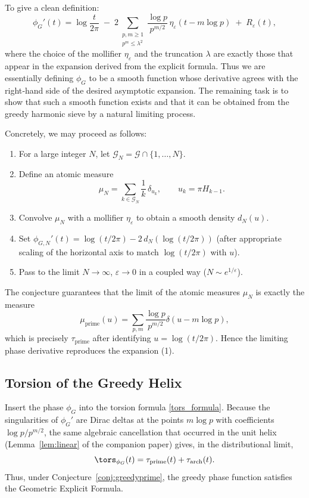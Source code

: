 To give a clean definition:
\[
\phi_G'(t) = \log\frac{t}{2\pi} \;-\; 2\sum_{\substack{p,m\ge1\\ p^m\le\lambda^2}} \frac{\log p}{p^{m/2}} \, \eta_\varepsilon(t - m\log p) \;+\; R_\varepsilon(t),
\]
where the choice of the mollifier \(\eta_\varepsilon\) and the truncation \(\lambda\) are exactly those that appear in the expansion derived from the explicit formula.  Thus we are essentially defining \(\phi_G\) to be a smooth function whose derivative agrees with the right‑hand side of the desired asymptotic expansion.  The remaining task is to show that such a smooth function exists and that it can be obtained from the greedy harmonic sieve by a natural limiting process.

Concretely, we may proceed as follows:
\begin{enumerate}
\item For a large integer \(N\), let \(\mathcal{G}_N = \mathcal{G}\cap\{1,\dots,N\}\).
\item Define an atomic measure
\[
\mu_N = \sum_{k\in\mathcal{G}_N} \frac{1}{k} \, \delta_{u_k}, \qquad u_k = \pi H_{k-1}.
\]
\item Convolve \(\mu_N\) with a mollifier \(\eta_\varepsilon\) to obtain a smooth density \(d_N(u)\).
\item Set \(\phi_{G,N}'(t) = \log(t/2\pi) - 2\,d_N(\log(t/2\pi))\) (after appropriate scaling of the horizontal axis to match \(\log(t/2\pi)\) with \(u\)).
\item Pass to the limit \(N\to\infty\), \(\varepsilon\to0\) in a coupled way (\(N\sim e^{1/\varepsilon}\)).
\end{enumerate}
The conjecture guarantees that the limit of the atomic measures \(\mu_N\) is exactly the measure
\[
\mu_{\text{prime}}(u) = \sum_{p,m} \frac{\log p}{p^{m/2}} \delta(u - m\log p),
\]
which is precisely \(\tau_{\text{prime}}\) after identifying \(u = \log(t/2\pi)\).  Hence the limiting phase derivative reproduces the expansion (1).

\subsection{Torsion of the Greedy Helix}

Insert the phase \(\phi_G\) into the torsion formula \eqref{tors_formula}.  Because the singularities of \(\phi_G'\) are Dirac deltas at the points \(m\log p\) with coefficients \(\log p/p^{m/2}\), the same algebraic cancellation that occurred in the unit helix (Lemma~\ref{lem:linear} of the companion paper) gives, in the distributional limit,
\[
\tors_{\phi_G}(t) = \tau_{\text{prime}}(t) + \tau_{\text{arch}}(t).
\]
Thus, under Conjecture~\ref{conj:greedyprime}, the greedy phase function satisfies the Geometric Explicit Formula.

